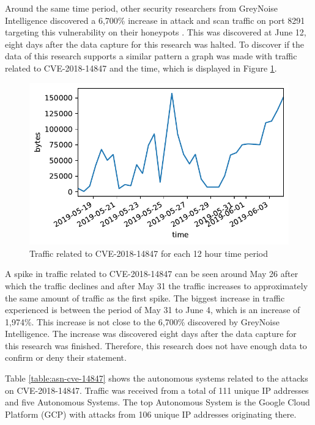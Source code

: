 Around the same time period, other security researchers from GreyNoise Intelligence discovered a 6,700\% increase in attack and scan traffic on port 8291 targeting this vulnerability on their honeypots \cite{6700INC14847:TWITTER:2019}. This was discovered at June 12, eight days after the data capture for this research was halted. To discover if the data of this research supports a similar pattern a graph was made with traffic related to CVE-2018-14847 and the time, which is displayed in Figure \ref{fig:CVE-2018-14847-TRAFFIC}.

\begin{figure}[ht]
    \includegraphics[width=\linewidth]{images/cve_14847_traffic.pdf}
    \caption{Traffic related to CVE-2018-14847 for each 12 hour time period}
    \label{fig:CVE-2018-14847-TRAFFIC}
\end{figure}

A spike in traffic related to CVE-2018-14847 can be seen around May 26 after which the traffic declines and after May 31 the traffic increases to approximately the same amount of traffic as the first spike. The biggest increase in traffic experienced is between the period of May 31 to June 4, which is an increase of 1,974\%. This increase is not close to the 6,700\% discovered by GreyNoise Intelligence. The increase was discovered eight days after the data capture for this research was finished. Therefore, this research does not have enough data to confirm or deny their statement. 

Table \ref{table:asn-cve-14847} shows the autonomous systems related to the attacks on CVE-2018-14847. Traffic was received from a total of 111 unique IP addresses and five Autonomous Systems. The top Autonomous System is the Google Cloud Platform (GCP) with attacks from 106 unique IP addresses originating there.

